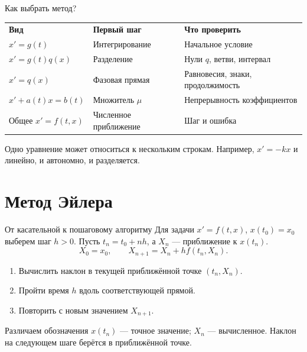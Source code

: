 \documentclass[aspectratio=169,11pt]{beamer}
\begin{document}
\begin{frame}{Как выбрать метод?}
\renewcommand{\arraystretch}{1.5}
\begin{tabular}{>{\raggedright\arraybackslash}p{}
>{\raggedright\arraybackslash}p{}
>{\raggedright\arraybackslash}p{}}
\textbf{Вид} & \textbf{Первый шаг} & \textbf{Что проверить} \\
$x'=g(t)$ & Интегрирование & Начальное условие \\
$x'=g(t)q(x)$ & Разделение & Нули $q$, ветви, интервал \\
$x'=q(x)$ & Фазовая прямая & Равновесия, знаки, продолжимость \\
$x'+a(t)x=b(t)$ & Множитель $\mu$ & Непрерывность коэффициентов \\
Общее $x'=f(t,x)$ & Численное приближение & Шаг и ошибка
\end{tabular}
\medskip

Одно уравнение может относиться к нескольким строкам.
Например, $x'=-kx$ и линейно, и автономно, и разделяется.
\end{frame}

\section{Метод Эйлера}
\begin{frame}{От касательной к пошаговому алгоритму}
Для задачи $x'=f(t,x)$, $x(t_0)=x_0$ выберем шаг $h>0$.
Пусть $t_n=t_0+nh$, а $X_n$ --- приближение к $x(t_n)$.
\[
\boxed{X_0=x_0,\qquad X_{n+1}=X_n+h f(t_n,X_n)}.
\]
\begin{enumerate}
\item Вычислить наклон в текущей приближённой точке $(t_n,X_n)$.
\item Пройти время $h$ вдоль соответствующей прямой.
\item Повторить с новым значением $X_{n+1}$.
\end{enumerate}
\begin{alertblock}{Различаем обозначения}
$x(t_n)$ --- точное значение; $X_n$ --- вычисленное.
Наклон на следующем шаге берётся в приближённой точке.
\end{alertblock}
\end{frame}
\end{document}
